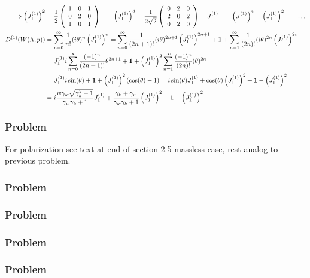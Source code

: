 \begin{widetext}
\begin{align*}
		\Rightarrow \left(J_1^{(1)}\right)^2&=\dfrac{1}{2}
		\left(\begin{array}{ccc}
			1&  0& 1 \\
			0&  2& 0 \\
			1&  0& 1
		\end{array}\right)\qquad
		\left(J_1^{(1)}\right)^3=\dfrac{1}{2\sqrt{2}}
		\left(\begin{array}{ccc}
			0&  2& 0 \\
			2&  0& 2 \\
			0&  2& 0
		\end{array}\right)=J_1^{(1)}
		\qquad
		\left(J_1^{(1)}\right)^4=\left(J_1^{(1)}\right)^2
		\qquad\dots\\
		D^{(1)}(W(\Lambda,p))&=\sum\limits_{n=0}^{\infty}\dfrac{1}{n!}(i\theta)^n \left(J_1^{(1)}\right)^n
		=\sum\limits_{n=0}^{\infty}\dfrac{1}{(2n+1)!}(i\theta)^{2n+1}\left(J_1^{(1)}\right)^{2n+1} + \mathbf{1} +\sum\limits_{n=1}^{\infty}\dfrac{1}{(2n)!}(i\theta)^{2n}\left(J_1^{(1)}\right)^{2n}\\
		&=J_1^{(1)} i \sum\limits_{n=0}^{\infty}\dfrac{(-1)^{n}}{(2n+1)!}\theta^{2n+1} + \mathbf{1} +\left(J_1^{(1)}\right)^{2}\sum\limits_{n=1}^{\infty}\dfrac{(-1)^{n}}{(2n)!}(\theta)^{2n}\\
		&=J_1^{(1)} i \sin(\theta) +\mathbf{1}+ \left(J_1^{(1)}\right)^{2}(\cos(\theta) -1)
		=i \sin(\theta) J_1^{(1)} +\cos(\theta) \left(J_1^{(1)}\right)^2 + \mathbf{1} - \left(J_1^{(1)}\right)^2\\
		&=i \dfrac{w\gamma_w\sqrt{\gamma_k^2-1}}{\gamma_w \gamma_k+1} J_1^{(1)} +\dfrac{\gamma_k+\gamma_w}{\gamma_w \gamma_k+1} \left(J_1^{(1)}\right)^2 + \mathbf{1} - \left(J_1^{(1)}\right)^2
	\end{align*}
\end{widetext}

\subsubsection{Problem}
\todo For polarization see text at end of section 2.5 massless case, rest analog to previous problem.


\subsubsection{Problem}
\todo


\subsubsection{Problem}
\todo


\subsubsection{Problem}
\todo


\subsubsection{Problem}
\todo


